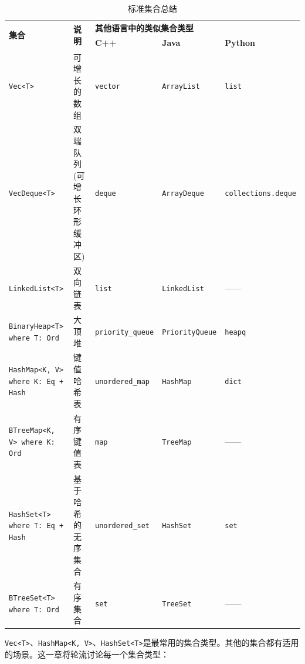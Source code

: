 \begin{table}[htbp]
    \centering
    \caption{标准集合总结}
    \label{t16-1}
    \begin{tabular}{p{}p{}lll}
        \hline
        \multirow{2}{*}{\textbf{集合}}  & \multirow{2}{*}{\textbf{说明}} & \multicolumn{3}{l}{\textbf{其他语言中的类似集合类型}} \\
        \cline{3-5}
         & & \textbf{C++} & \textbf{Java} & \textbf{Python} \\
        \hline
        
        \texttt{Vec<T>} & 可增长的数组  & \texttt{vector} & \texttt{ArrayList} & \texttt{list}  \\
        \rowcolor{tablecolor}
        \texttt{VecDeque<T>} & 双端队列(可增长环形缓冲区) & \texttt{deque} & \texttt{ArrayDeque} & \texttt{collections.deque} \\
        \texttt{LinkedList<T>} & 双向链表 & \texttt{list} & \texttt{LinkedList} & —— \\
        \rowcolor{tablecolor}
        \texttt{BinaryHeap<T> where T: Ord} & 大顶堆 & \texttt{priority\_queue} & \texttt{PriorityQueue} & \texttt{heapq} \\
        \texttt{HashMap<K, V> where K: Eq + Hash} & 键值哈希表 & \texttt{unordered\_map} & \texttt{HashMap} & \texttt{dict} \\
        \rowcolor{tablecolor}
        \texttt{BTreeMap<K, V> where K: Ord} & 有序键值表 & \texttt{map} & \texttt{TreeMap} & —— \\
        \texttt{HashSet<T> where T: Eq + Hash} & 基于哈希的无序集合 & \texttt{unordered\_set} & \texttt{HashSet} & \texttt{set} \\
        \rowcolor{tablecolor}
        \texttt{BTreeSet<T> where T: Ord} & 有序集合 & \texttt{set} & \texttt{TreeSet} & —— \\
    \end{tabular}
\end{table}

\texttt{Vec<T>}、\texttt{HashMap<K, V>}、\texttt{HashSet<T>}是最常用的集合类型。其他的集合都有适用的场景。这一章将轮流讨论每一个集合类型：



